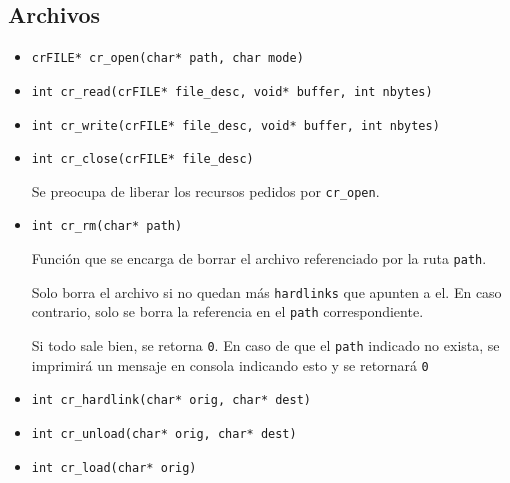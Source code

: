 \documentclass[12pt]{article}
\def\code#1{\texttt{#1}}
\begin{document}
\subsection*{Archivos}
\begin{itemize}
	\item \code{crFILE* cr\_open(char* path, char mode)}
	\item \code{int cr\_read(crFILE* file\_desc, void* buffer, int nbytes)}
	\item \code{int cr\_write(crFILE* file\_desc, void* buffer, int nbytes)}
	\item \code{int cr\_close(crFILE* file\_desc)}
	
	Se preocupa de liberar los recursos pedidos por \code{cr\_open}.
	
	\item \code{int cr\_rm(char* path)}
	
	Función que se encarga de borrar el archivo referenciado por la ruta \code{path}.

	Solo borra el archivo si no quedan más \code{hardlinks} que apunten a el. En caso contrario, solo se borra la referencia en el \code{path} correspondiente.
	
	Si todo sale bien, se retorna \code{0}. En caso de que el \code{path} indicado no exista, se imprimirá un mensaje en consola indicando esto y se retornará \code{0}
	\item \code{int cr\_hardlink(char* orig, char* dest)}
	\item \code{int cr\_unload(char* orig, char* dest)}
	\item \code{int cr\_load(char* orig)}
\end{itemize}
\end{document}
